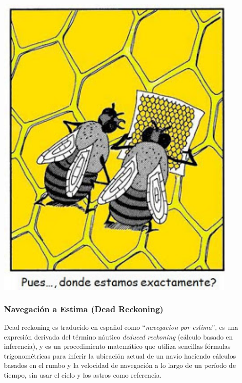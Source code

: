 \begin{minipage}[b]{0.350\linewidth}
\centering
\includegraphics[width=0.9\textwidth]{Imagenes/06.00.navegacion/donde_estamos.jpg}  
\end{minipage}





\subsubsection{Navegaci\'on a Estima (Dead Reckoning) \cite{Salazar_nav_aerea}}

  Dead reckoning es traducido en espa\~nol como ``\textit{navegacion
    por estima}'', es una expresi\'on derivada del t\'ermino n\'autico
  \textit{deduced reckoning} (c\'alculo basado en inferencia), y es un
  procedimiento matem\'atico que utiliza sencillas f\'ormulas
  trigonom\'etricas para inferir la ubicaci\'on actual de un nav\'io
  haciendo c\'alculos basados en el rumbo y la velocidad de
  navegaci\'on a lo largo de un per\'iodo de tiempo, sin usar el cielo
  y los astros como referencia.

